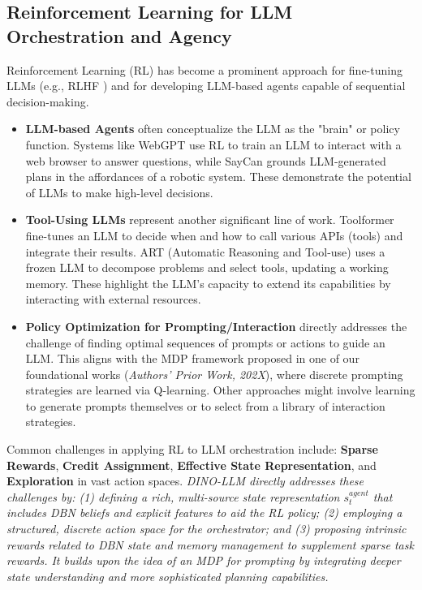 \documentclass[11pt]{article}
\begin{document}
\subsection{Reinforcement Learning for LLM Orchestration and Agency}
\label{sec:rw_rl_llm}
Reinforcement Learning (RL) has become a prominent approach for fine-tuning LLMs (e.g., RLHF \citep{Ouyang2022TrainingLM}) and for developing LLM-based agents capable of sequential decision-making.
\begin{itemize}
    \item \textbf{LLM-based Agents} often conceptualize the LLM as the "brain" or policy function. Systems like WebGPT \citep{Nakano2021WebGPTBO} use RL to train an LLM to interact with a web browser to answer questions, while SayCan \citep{Ahn2022CanSA} grounds LLM-generated plans in the affordances of a robotic system. These demonstrate the potential of LLMs to make high-level decisions.
    \item \textbf{Tool-Using LLMs} represent another significant line of work. Toolformer \citep{Schick2023ToolformerLM} fine-tunes an LLM to decide when and how to call various APIs (tools) and integrate their results. ART (Automatic Reasoning and Tool-use) \citep{Parisi2022ARTAR} uses a frozen LLM to decompose problems and select tools, updating a working memory. These highlight the LLM's capacity to extend its capabilities by interacting with external resources.
    \item \textbf{Policy Optimization for Prompting/Interaction} directly addresses the challenge of finding optimal sequences of prompts or actions to guide an LLM. This aligns with the MDP framework proposed in one of our foundational works (\textit{Authors' Prior Work, 202X}), where discrete prompting strategies are learned via Q-learning. Other approaches might involve learning to generate prompts themselves or to select from a library of interaction strategies.
\end{itemize}
Common challenges in applying RL to LLM orchestration include:
\textbf{Sparse Rewards}, \textbf{Credit Assignment}, \textbf{Effective State Representation}, and \textbf{Exploration} in vast action spaces.
\textit{DINO-LLM directly addresses these challenges by: (1) defining a rich, multi-source state representation $s_t^{agent}$ that includes DBN beliefs and explicit features to aid the RL policy; (2) employing a structured, discrete action space for the orchestrator; and (3) proposing intrinsic rewards related to DBN state and memory management to supplement sparse task rewards. It builds upon the idea of an MDP for prompting by integrating deeper state understanding and more sophisticated planning capabilities.}
\end{document}
